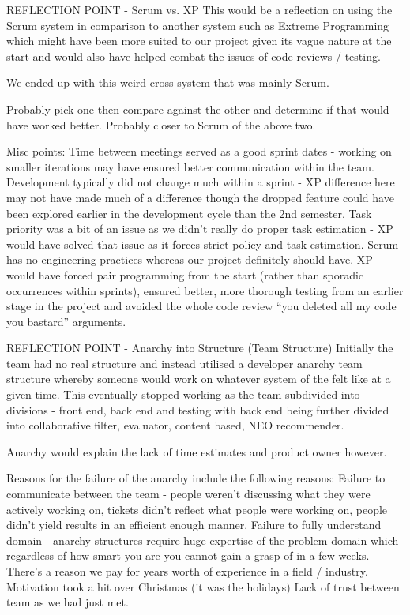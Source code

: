 \documentclass{l3proj}
\begin{document}

REFLECTION POINT - Scrum vs. XP
This would be a reflection on using the Scrum system in comparison to another system such as Extreme Programming which might have been more suited to our project given its vague nature at the start and would also have helped combat the issues of code reviews / testing.

We ended up with this weird cross system that was mainly Scrum.

Probably pick one then compare against the other and determine if that would have worked better. Probably closer to Scrum of the above two.

Misc points:
Time between meetings served as a good sprint dates - working on smaller iterations may have ensured better communication within the team.
Development typically did not change much within a sprint - XP difference here may not have made much of a difference though the dropped feature could have been explored earlier in the development cycle than the 2nd semester.
Task priority was a bit of an issue as we didn’t really do proper task estimation - XP would have solved that issue as it forces strict policy and task estimation.
Scrum has no engineering practices whereas our project definitely should have. XP would have forced pair programming from the start (rather than sporadic occurrences within sprints), ensured better, more thorough testing from an earlier stage in the project and avoided the whole code review “you deleted all my code you bastard” arguments.

REFLECTION POINT - Anarchy into Structure (Team Structure)
Initially the team had no real structure and instead utilised a developer anarchy team structure whereby someone would work on whatever system of the felt like at a given time. This eventually stopped working as the team subdivided into divisions - front end, back end and testing with back end being further divided into collaborative filter, evaluator, content based, NEO recommender.

Anarchy would explain the lack of time estimates and product owner however.

Reasons for the failure of the anarchy include the following reasons:
Failure to communicate between the team - people weren’t discussing what they were actively working on, tickets didn’t reflect what people were working on, people didn’t yield results in an efficient enough manner.
Failure to fully understand domain - anarchy structures require huge expertise of the problem domain which regardless of how smart you are you cannot gain a grasp of in a few weeks. There’s a reason we pay for years worth of experience in a field / industry.
Motivation took a hit over Christmas (it was the holidays)
Lack of trust between team as we had just met.
\end{document}
